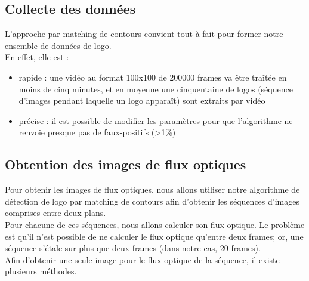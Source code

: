 \documentclass[11pt]{article}
\begin{document}
\subsection{Collecte des données}
\label{sec:org1bd24b6}
L'approche par matching de contours convient tout à fait pour former notre ensemble de données de logo.\\

En effet, elle est :\\
\begin{itemize}
\item rapide : une vidéo au format 100x100 de 200000 frames va être traîtée en moins de cinq minutes, et en moyenne une cinquentaine de logos (séquence d'images pendant laquelle un logo apparaît) sont extraits par vidéo\\
\item précise : il est possible de modifier les paramètres pour que l'algorithme ne renvoie presque pas de faux-positifs (>1\%)\\
\end{itemize}

\subsection{Obtention des images de flux optiques}
\label{sec:org9b421df}
Pour obtenir les images de flux optiques, nous allons utiliser notre algorithme de détection de logo par matching de contours afin d'obtenir les séquences d'images comprises entre deux plans.\\
Pour chacune de  ces séquences, nous allons calculer son flux optique. Le problème est qu'il n'est possible de ne calculer le flux optique qu'entre deux frames; or, une séquence s'étale sur plus que deux frames (dans notre cas, 20 frames).\\
Afin d'obtenir une seule image pour le flux optique de la séquence, il existe plusieurs méthodes.\\
\end{document}
